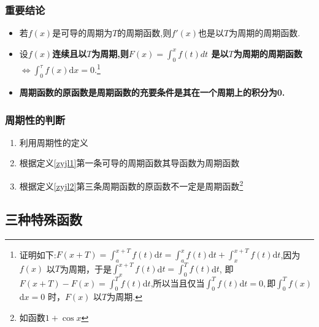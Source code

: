 \documentclass[8pt a4paper, oneside, UTF8]{ctexbook}  %
\begin{document}
\begin{sloppypar}
    \subsubsection{重要结论}
    \begin{itemize}
        \item 若$f(x)$是可导的周期为$T$的周期函数,则$f'(x)$也是以$T$为周期的周期函数.\label{zyjl1}
        \item 设$f(x)$\textbf{连续且以$T$为周期,则$F(x)=\int_0 ^x f(t)dt$ 是以$T$为周期的周期函数$\Leftrightarrow\int_{0}^{\tau}f(x)\mathrm{d}x=0.$}\footnote{证明如下:$F(x+T)=\int_{a}^{x+T}f(t)\mathrm{d}t=\int_{a}^{x}f(t)\mathrm{d}t+\int_{x}^{x+T}f(t)\mathrm{d}t$,因为$f(x)$ 以$T$为周期，于是$\int _x^{x+ T}f( t) $d$t= \int _0^Tf( t) $d$t$, 即$F( x+ T) - F( x) = \int _0^Tf( t) $d$t$,所以当且仅当$\int _0^Tf( t) $d$t= 0, $即$\int _0^Tf( x) $d$x= 0$ 时，$F(x)$ 以$T$为周期.}
        \item \textbf{周期函数的原函数是周期函数的充要条件是其在一个周期上的积分为0.}\label{zyjl2}
    \end{itemize}
    \subsubsection{周期性的判断}
    \begin{enumerate}
        \item 利用周期性的定义
        \item 根据定义\ref{zyjl1}第一条可导的周期函数其导函数为周期函数
        \item 根据定义\ref{zyjl2}第三条周期函数的原函数不一定是周期函数\footnote{如函数$1+\cos x$}
    \end{enumerate}
    \subsection{三种特殊函数}

\end{sloppypar}
\end{document}
